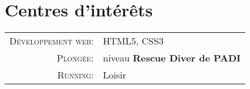%
%
%

\section{\texorpdfstring{\color{Blue}Centres d'intérêts}{Centres d'intérêts}}
\begin{tabular}{rl}
    \textsc{Développement web:} & HTML5, CSS3 \\ 
    \textsc{Plongée:} & niveau \textbf{Rescue Diver de PADI} \\
    \textsc{Running:} & Loisir \\
\end{tabular}
